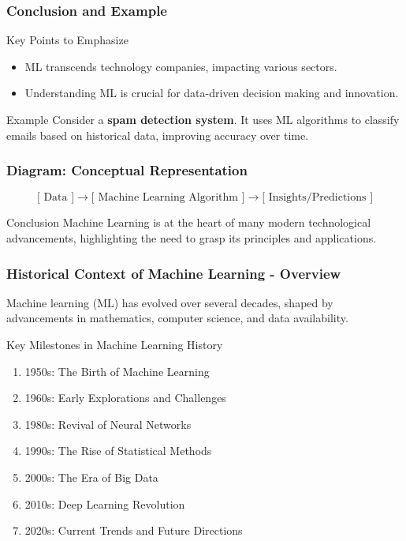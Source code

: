 \documentclass[aspectratio=169]{beamer}
\begin{document}
\begin{frame}[fragile]
    \frametitle{Conclusion and Example}
    \begin{block}{Key Points to Emphasize}
        \begin{itemize}
            \item ML transcends technology companies, impacting various sectors.
            \item Understanding ML is crucial for data-driven decision making and innovation.
        \end{itemize}
    \end{block}

    \begin{block}{Example}
        Consider a \textbf{spam detection system}. It uses ML algorithms to classify emails based on historical data, improving accuracy over time.
    \end{block}
\end{frame}

\begin{frame}[fragile]
    \frametitle{Diagram: Conceptual Representation}
    \begin{center}
        \begin{equation}
            \text{[ Data ]} \rightarrow \text{[ Machine Learning Algorithm ]} \rightarrow \text{[ Insights/Predictions ]}
        \end{equation}
    \end{center}
    \begin{block}{Conclusion}
        Machine Learning is at the heart of many modern technological advancements, highlighting the need to grasp its principles and applications.
    \end{block}
\end{frame}

\begin{frame}[fragile]
    \frametitle{Historical Context of Machine Learning - Overview}
    Machine learning (ML) has evolved over several decades, shaped by advancements in mathematics, computer science, and data availability. 
    \begin{block}{Key Milestones in Machine Learning History}
        \begin{enumerate}
            \item 1950s: The Birth of Machine Learning
            \item 1960s: Early Explorations and Challenges
            \item 1980s: Revival of Neural Networks
            \item 1990s: The Rise of Statistical Methods
            \item 2000s: The Era of Big Data
            \item 2010s: Deep Learning Revolution
            \item 2020s: Current Trends and Future Directions
        \end{enumerate}
    \end{block}
\end{frame}
\end{document}
